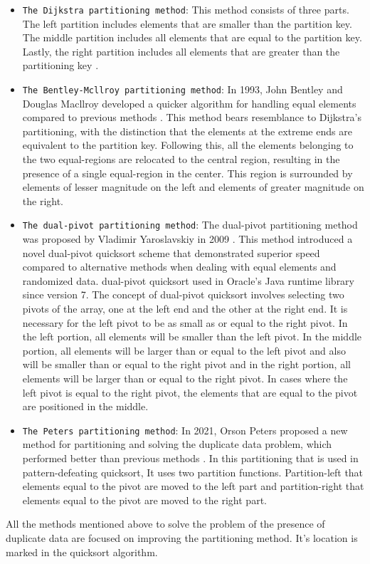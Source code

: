 \documentclass{article}
\begin{document}
\begin{itemize}
\item {\texttt{The Dijkstra partitioning method}}: This method consists of three parts. The left partition includes elements that are smaller than the partition key. The middle partition includes all elements that are equal to the partition key. Lastly, the right partition includes all elements that are greater than the partitioning key \cite{Dj}.\\
\item {\texttt{The Bentley-Mcllroy partitioning method}}: In 1993, John Bentley and Douglas Macllroy developed a quicker algorithm for handling equal elements compared to previous methods \cite{Bm}. This method bears resemblance to Dijkstra's partitioning, with the distinction that the elements at the extreme ends are equivalent to the partition key. Following this, all the elements belonging to the two equal-regions are relocated to the central region, resulting in the presence of a single equal-region in the center. This region is surrounded by elements of lesser magnitude on the left and elements of greater magnitude on the right.\\
\item {\texttt{The dual-pivot partitioning method}}: The dual-pivot partitioning method was proposed by Vladimir Yaroslavskiy in 2009 \cite{ya} . This method introduced a novel dual-pivot quicksort scheme that demonstrated superior speed compared to alternative methods when dealing with equal elements and randomized data. dual-pivot quicksort used in Oracle’s Java runtime library since version 7. The concept of dual-pivot quicksort involves selecting two pivots of the array, one at the left end and the other at the right end. It is necessary for the left pivot to be as small as or equal to the right pivot. In the left portion, all elements will be smaller than the left pivot. In the middle portion, all elements will be larger than or equal to the left pivot and also will be smaller than or equal to the right pivot and in the right portion, all elements will be larger than or equal to the right pivot. In cases where the left pivot is equal to the right pivot, the elements that are equal to the pivot are positioned in the middle.\\

 \item {\texttt{The Peters partitioning method}}: In 2021, Orson Peters proposed a new method for partitioning and solving the duplicate data problem, which performed better than previous methods \cite{Op}. In this partitioning that is used in pattern-defeating quicksort, It uses two partition functions. Partition-left that elements equal to the pivot are moved to the left part and partition-right that elements equal to the pivot are moved to the right part.\\

\end{itemize}
 All the methods mentioned above to solve the problem of the presence of duplicate data are focused on improving the partitioning method. It's location is marked in the quicksort algorithm.\\
\end{document}
